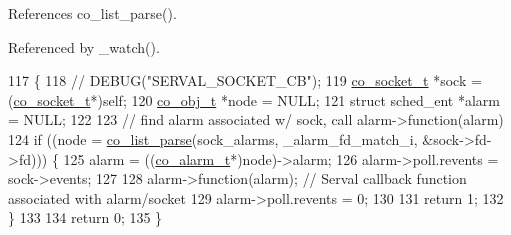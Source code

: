 References co\+\_\+list\+\_\+parse().



Referenced by \+\_\+watch().


\begin{DoxyCode}
117                                                         \{
118 \textcolor{comment}{//   DEBUG("SERVAL\_SOCKET\_CB");}
119   \hyperlink{structco__socket__t}{co\_socket\_t} *sock = (\hyperlink{structco__socket__t}{co\_socket\_t}*)\textcolor{keyword}{self};
120   \hyperlink{structco__obj__t}{co\_obj\_t} *node = NULL;
121   \textcolor{keyword}{struct }sched\_ent *alarm = NULL;
122   
123   \textcolor{comment}{// find alarm associated w/ sock, call alarm->function(alarm)}
124   \textcolor{keywordflow}{if} ((node = \hyperlink{list_8c_a53067bb4fab9f78bdc6e69381bbccd16}{co\_list\_parse}(sock\_alarms, \_alarm\_fd\_match\_i, &sock->fd->fd))) \{
125     alarm = ((\hyperlink{structco__alarm__t}{co\_alarm\_t}*)node)->alarm;
126     alarm->poll.revents = sock->events;
127     
128     alarm->function(alarm); \textcolor{comment}{// Serval callback function associated with alarm/socket}
129     alarm->poll.revents = 0;
130     
131     \textcolor{keywordflow}{return} 1;
132   \}
133   
134   \textcolor{keywordflow}{return} 0;
135 \}
\end{DoxyCode}
